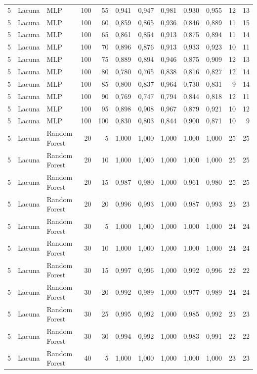 \begin{longtable}{@{}rllrrrrrrrrr@{}}
5 & Lacuna & MLP & 100 & 55 & 0,941 & 0,947 & 0,981 & 0,930 & 0,955 & 12 & 13 \\
5 & Lacuna & MLP & 100 & 60 & 0,859 & 0,865 & 0,936 & 0,846 & 0,889 & 11 & 15 \\
5 & Lacuna & MLP & 100 & 65 & 0,861 & 0,854 & 0,913 & 0,875 & 0,894 & 11 & 14 \\
5 & Lacuna & MLP & 100 & 70 & 0,896 & 0,876 & 0,913 & 0,933 & 0,923 & 10 & 11 \\
5 & Lacuna & MLP & 100 & 75 & 0,889 & 0,894 & 0,946 & 0,875 & 0,909 & 12 & 13 \\
5 & Lacuna & MLP & 100 & 80 & 0,780 & 0,765 & 0,838 & 0,816 & 0,827 & 12 & 14 \\
5 & Lacuna & MLP & 100 & 85 & 0,800 & 0,837 & 0,964 & 0,730 & 0,831 & 9 & 14 \\
5 & Lacuna & MLP & 100 & 90 & 0,769 & 0,747 & 0,794 & 0,844 & 0,818 & 12 & 11 \\
5 & Lacuna & MLP & 100 & 95 & 0,898 & 0,908 & 0,967 & 0,879 & 0,921 & 10 & 12 \\
5 & Lacuna & MLP & 100 & 100 & 0,830 & 0,803 & 0,844 & 0,900 & 0,871 & 10 & 9 \\
5 & Lacuna & Random Forest & 20 & 5 & 1,000 & 1,000 & 1,000 & 1,000 & 1,000 & 25 & 25 \\
5 & Lacuna & Random Forest & 20 & 10 & 1,000 & 1,000 & 1,000 & 1,000 & 1,000 & 25 & 25 \\
5 & Lacuna & Random Forest & 20 & 15 & 0,987 & 0,980 & 1,000 & 0,961 & 0,980 & 25 & 25 \\
5 & Lacuna & Random Forest & 20 & 20 & 0,996 & 0,993 & 1,000 & 0,987 & 0,993 & 23 & 23 \\
5 & Lacuna & Random Forest & 30 & 5 & 1,000 & 1,000 & 1,000 & 1,000 & 1,000 & 24 & 24 \\
5 & Lacuna & Random Forest & 30 & 10 & 1,000 & 1,000 & 1,000 & 1,000 & 1,000 & 24 & 24 \\
5 & Lacuna & Random Forest & 30 & 15 & 0,997 & 0,996 & 1,000 & 0,992 & 0,996 & 22 & 22 \\
5 & Lacuna & Random Forest & 30 & 20 & 0,992 & 0,989 & 1,000 & 0,977 & 0,989 & 24 & 24 \\
5 & Lacuna & Random Forest & 30 & 25 & 0,995 & 0,992 & 1,000 & 0,985 & 0,992 & 23 & 23 \\
5 & Lacuna & Random Forest & 30 & 30 & 0,994 & 0,992 & 1,000 & 0,983 & 0,991 & 22 & 22 \\
5 & Lacuna & Random Forest & 40 & 5 & 1,000 & 1,000 & 1,000 & 1,000 & 1,000 & 23 & 23 \\

\end{longtable}
